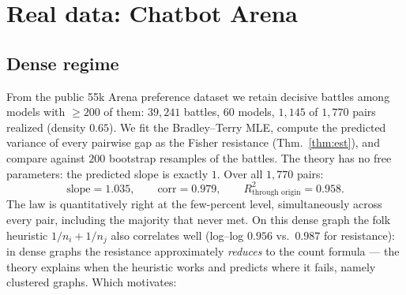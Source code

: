\documentclass[11pt]{article}
\begin{document}
\section{Real data: Chatbot Arena}\label{sec:arena}

\subsection{Dense regime}
From the public 55k Arena preference dataset we retain decisive battles
among models with $\ge 200$ of them: $39{,}241$ battles, $60$ models,
$1{,}145$ of $1{,}770$ pairs realized (density $0.65$). We fit the
Bradley--Terry MLE, compute the predicted variance of every pairwise gap
as the Fisher resistance (Thm.~\ref{thm:est}), and compare against $200$
bootstrap resamples of the battles. The theory has no free parameters:
the predicted slope is exactly $1$. Over all $1{,}770$ pairs:
\[
\text{slope} = 1.035, \qquad \text{corr} = 0.979, \qquad
R^2_{\text{through origin}} = 0.958 .
\]
The law is quantitatively right at the few-percent level, simultaneously
across every pair, including the majority that never met. On this dense
graph the folk heuristic $1/n_i + 1/n_j$ also correlates well (log--log
$0.956$ vs.\ $0.987$ for resistance): in dense graphs the resistance
approximately \emph{reduces} to the count formula --- the theory explains
when the heuristic works and predicts where it fails, namely clustered
graphs. Which motivates:
\end{document}
